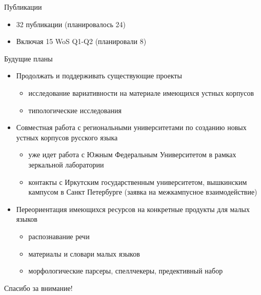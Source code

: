 \documentclass[
  13pt,
  ignorenonframetext,
]{beamer}
\providecommand{\tightlist}{%
  \setlength{\itemsep}{0pt}\setlength{\parskip}{0pt}}
\begin{document}
\begin{frame}{Публикации}
\protect\hypertarget{ux43fux443ux431ux43bux438ux43aux430ux446ux438ux438}{}
\begin{itemize}
\tightlist
\item
  32 публикации (планировалось 24)
\item
  Включая 15 WoS Q1-Q2 (планировали 8)
\end{itemize}
\end{frame}

\begin{frame}{Будущие планы}
\protect\hypertarget{ux431ux443ux434ux443ux449ux438ux435-ux43fux43bux430ux43dux44b}{}
\begin{itemize}
\tightlist
\item
  Продолжать и поддерживать существующие проекты

  \begin{itemize}
  \tightlist
  \item
    исследование вариативности на материале имеющихся устных корпусов
  \item
    типологические исследования
  \end{itemize}
\item
  Совместная работа с региональными университетами по созданию новых
  устных корпусов русского языка

  \begin{itemize}
  \tightlist
  \item
    уже идет работа с Южным Федеральным Университетом в рамках
    зеркальной лаборатории
  \item
    контакты с Иркутским государственным университетом, вышкинским
    кампусом в Санкт Петербурге (заявка на межкампусное взаимодействие)
  \end{itemize}
\item
  Переориентация имеющихся ресурсов на конкретные продукты для малых
  языков

  \begin{itemize}
  \tightlist
  \item
    распознавание речи
  \item
    материалы и словари малых языков
  \item
    морфологические парсеры, спеллчекеры, предективный набор
  \end{itemize}
\end{itemize}
\end{frame}

\begin{frame}{}
\protect\hypertarget{section}{}
\LARGE Спасибо за внимание!
\end{frame}
\end{document}
